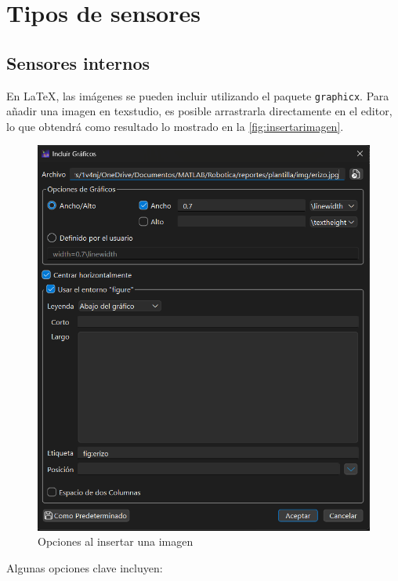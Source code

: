 \section{Tipos de sensores}
\subsection{Sensores internos}
En \LaTeX, las imágenes se pueden incluir utilizando el paquete \texttt{graphicx}. 
Para añadir una imagen en texstudio, es posible arrastrarla directamente en el editor, lo que obtendrá como resultado lo mostrado en la \autoref{fig:insertarimagen}.

\begin{figure}[h]
	\centering
	\includegraphics[width=0.7\linewidth]{img/insertarImagen}
	\caption{Opciones al insertar una imagen}
	\label{fig:insertarimagen}
\end{figure}

Algunas opciones clave incluyen:

